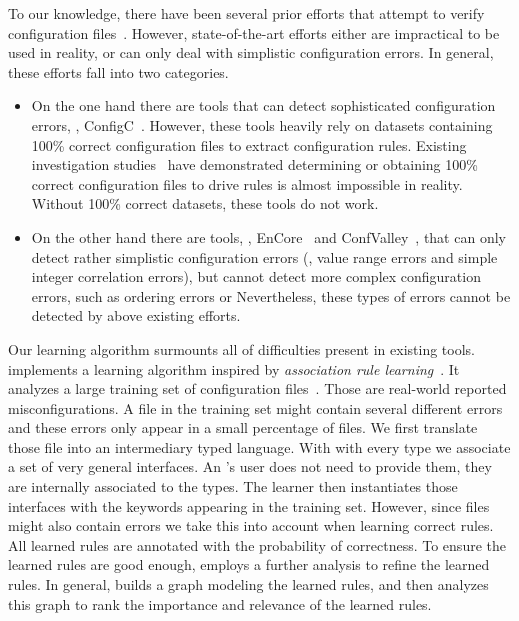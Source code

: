 To our knowledge, there have been several prior efforts that attempt to verify 
configuration files~\cite{santolucitoCAV, xu16early,
zhang14encore, huang15confvalley}.
However, state-of-the-art efforts either are impractical to be used
in reality, or can only deal with simplistic configuration errors.
In general, these efforts fall into two categories.\begin{itemize}
\item On the one hand there are tools that can detect sophisticated 
configuration errors, \eg, ConfigC~\cite{santolucitoCAV}. 
However, these tools heavily rely on datasets containing 100\% 
correct configuration files to extract configuration rules.
Existing investigation studies~\cite{wang04automatic, yin11anempirical}
have demonstrated determining or obtaining 100\% correct configuration
files to drive rules is almost impossible in reality. 
Without 100\% correct datasets, these tools do not work.
\item On the other hand there are tools, 
\eg, EnCore~\cite{zhang14encore} and
ConfValley~\cite{huang15confvalley}, that can only 
detect rather simplistic configuration errors (\eg, value range errors 
and simple integer correlation errors), but cannot detect
more complex configuration errors, such as ordering errors or 
Nevertheless, these types of errors cannot be detected by above existing
efforts.
\end{itemize}

Our learning algorithm surmounts all of difficulties present in 
existing tools.  \app implements a learning
algorithm inspired by {\em association rule
learning}~\cite{agrawal1993mining}. It analyzes a large training set of configuration  files~\cite{configdataset}. Those are real-world reported misconfigurations. A file in the training set might 
contain several different errors and these errors only appear 
in a small percentage of files. We first translate those file into an 
intermediary typed language. With with every type we associate 
a set of very general interfaces. An \app's user does not
need to provide them, they are internally associated to the types. The 
learner then instantiates those interfaces with the keywords appearing in 
the training set. However, since files might also contain errors we take 
this into account when learning correct rules. All learned rules are 
annotated with the probability of correctness.  
To ensure the learned rules are good enough,
\app employs a further analysis to refine the learned rules.
In general, \app builds a graph modeling the learned rules,
and then analyzes this graph to rank the importance
and relevance of the learned rules. 

